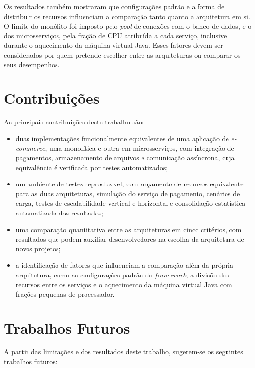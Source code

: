 Os resultados também mostraram que configurações padrão e a forma de distribuir os recursos
influenciam a comparação tanto quanto a arquitetura em si. O limite do monólito foi imposto pelo
\textit{pool} de conexões com o banco de dados, e o dos microsserviços, pela fração de CPU
atribuída a cada serviço, inclusive durante o aquecimento da máquina virtual Java. Esses fatores
devem ser considerados por quem pretende escolher entre as arquiteturas ou comparar os seus
desempenhos.

\section{Contribuições}

As principais contribuições deste trabalho são:

\begin{itemize}
    \item duas implementações funcionalmente equivalentes de uma aplicação de
    \textit{e-commerce}, uma monolítica e outra em microsserviços, com integração de
    pagamentos, armazenamento de arquivos e comunicação assíncrona, cuja equivalência é
    verificada por testes automatizados;
    \item um ambiente de testes reproduzível, com orçamento de recursos equivalente para as
    duas arquiteturas, simulação do serviço de pagamento, cenários de carga, testes de
    escalabilidade vertical e horizontal e consolidação estatística automatizada dos
    resultados;
    \item uma comparação quantitativa entre as arquiteturas em cinco critérios, com resultados
    que podem auxiliar desenvolvedores na escolha da arquitetura de novos projetos;
    \item a identificação de fatores que influenciam a comparação além da própria arquitetura,
    como as configurações padrão do \textit{framework}, a divisão dos recursos entre os
    serviços e o aquecimento da máquina virtual Java com frações pequenas de processador.
\end{itemize}

\section{Trabalhos Futuros}

A partir das limitações e dos resultados deste trabalho, sugerem-se os seguintes trabalhos
futuros:

